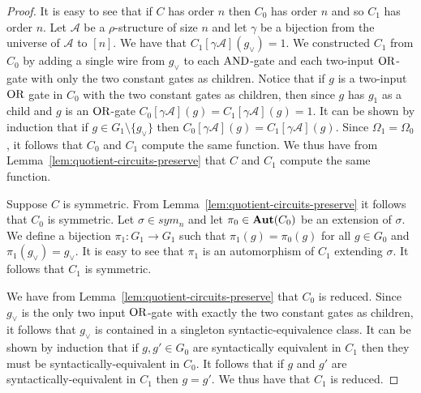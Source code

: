 \documentclass[../paper.tex]{subfiles}
\begin{document}
\begin{proof}


  It is easy to see that if $C$ has order $n$ then $C_0$ has order $n$ and so
  $C_1$ has order $n$. Let $\mathcal{A}$ be a $\rho$-structure of size $n$ and
  let $\gamma$ be a bijection from the universe of $\mathcal{A}$ to $[n]$. We
  have that $C_1[\gamma \mathcal{A}](g_\lor) = 1$. We constructed $C_1$ from
  $C_0$ by adding a single wire from $g_\lor$ to each $\text{\upshape AND}$-gate and each
  two-input $\text{\upshape OR}$-gate with only the two constant gates as children. Notice that
  if $g$ is a two-input $\text{\upshape OR}$ gate in $C_0$ with the two constant gates as
  children, then since $g$ has $g_1$ as a child and $g$ is an $\text{\upshape OR}$-gate
  $C_0[\gamma \mathcal{A}](g) = C_1[\gamma \mathcal{A}](g) = 1$. It can be shown
  by induction that if $g \in G_1 \setminus \{g_\lor\}$ then $C_0 [\gamma
  \mathcal{A}](g) = C_1[\gamma \mathcal{A}](g)$. Since $\Omega_1 = \Omega_0$, it
  follows that $C_0$ and $C_1$ compute the same function. We thus have from
  Lemma~\ref{lem:quotient-circuits-preserve} that $C$ and $C_1$ compute the same
  function.

  Suppose $C$ is symmetric. From Lemma~\ref{lem:quotient-circuits-preserve} it
  follows that $C_0$ is symmetric. Let $\sigma \in sym_n$ and let $\pi_0 \in
  \text{\textbf{Aut}}(C_0)$ be an extension of $\sigma$. We define a bijection $\pi_1 : G_1
  \rightarrow G_1$ such that $\pi_1 (g) = \pi_0(g)$ for all $g \in G_0$ and
  $\pi_1 (g_\lor) = g_\lor$. It is easy to see that $\pi_1$ is an automorphism
  of $C_1$ extending $\sigma$. It follows that $C_1$ is symmetric.

  We have from Lemma~\ref{lem:quotient-circuits-preserve} that $C_0$ is reduced.
  Since $g_\lor$ is the only two input $\text{\upshape OR}$-gate with exactly the two constant
  gates as children, it follows that $g_\lor$ is contained in a singleton
  syntactic-equivalence class. It can be shown by induction that if $g, g' \in
  G_0$ are syntactically equivalent in $C_1$ then they must be
  syntactically-equivalent in $C_0$. It follows that if $g$ and $g'$ are
  syntactically-equivalent in $C_1$ then $g = g'$. We thus have that $C_1$ is
  reduced.


\end{proof}
\end{document}
